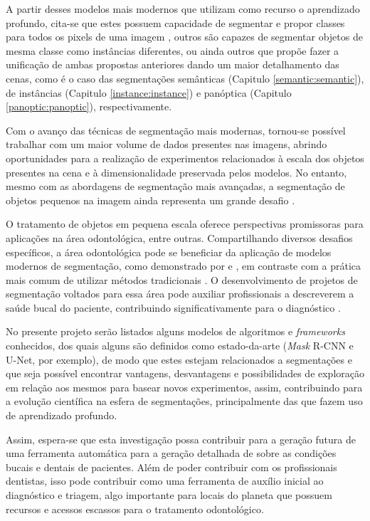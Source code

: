 A partir desses modelos mais modernos que utilizam como recurso o aprendizado profundo, cita-se que estes possuem capacidade de segmentar e propor classes para todos os pixels de uma imagem \citep{Minaee2021}, outros são capazes de segmentar objetos de mesma classe como instâncias diferentes, ou ainda outros que propõe fazer a unificação de ambas propostas anteriores dando um maior detalhamento das cenas, como é o caso das segmentações semânticas (Capitulo \ref{semantic:semantic}), de instâncias (Capitulo \ref{instance:instance}) e panóptica (Capitulo \ref{panoptic:panoptic}), respectivamente.

Com o avanço das técnicas de segmentação mais modernas, tornou-se possível trabalhar com um maior volume de dados presentes nas imagens, abrindo oportunidades para a realização de experimentos relacionados à escala dos objetos presentes na cena e à dimensionalidade preservada pelos modelos. No entanto, mesmo com as abordagens de segmentação mais avançadas, a segmentação de objetos pequenos na imagem ainda representa um grande desafio \citep{Sang2023Small-ObjectAttention, Su2021Small-scaleFusion}.

O tratamento de objetos em pequena escala oferece perspectivas promissoras para aplicações na área odontológica, entre outras. Compartilhando diversos desafios específicos, a área odontológica pode se beneficiar da aplicação de modelos modernos de segmentação, como demonstrado por \cite{Ghazvinian2021} e \cite{Minyoung2020}, em contraste com a prática mais comum de utilizar métodos tradicionais \citep{Hammad2020}. O desenvolvimento de projetos de segmentação voltados para essa área pode auxiliar profissionais a descreverem a saúde bucal do paciente, contribuindo significativamente para o diagnóstico \citep{Ghazvinian2021}.

No presente projeto serão listados alguns modelos de algoritmos e \textit{frameworks} conhecidos, dos quais alguns são definidos como estado-da-arte (\textit{Mask} R-CNN e U-Net, por exemplo), de modo que estes estejam relacionados a segmentações e que seja possível encontrar vantagens, desvantagens e possibilidades de exploração em relação aos mesmos para basear novos experimentos, assim, contribuindo para a evolução científica na esfera de segmentações, principalmente das que fazem uso de aprendizado profundo.

Assim, espera-se que esta investigação possa contribuir para a geração futura de uma ferramenta automática para a geração detalhada de sobre as condições bucais e dentais de pacientes. Além de poder contribuir com os profissionais dentistas, isso pode contribuir como uma ferramenta de auxílio inicial ao diagnóstico e triagem, algo importante para locais do planeta que possuem recursos e acessos escassos para o tratamento odontológico.

